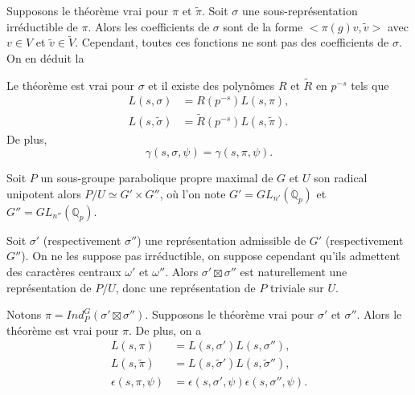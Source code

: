 Supposons le théorème vrai pour $\pi$ et $\tilde{\pi}$. Soit $\sigma$ une sous-représentation irréductible de $\pi$. Alors les coefficients de $\sigma$ sont de la forme $<\pi(g)v,\tilde{v}>$ avec $v\in V$ et $\tilde{v} \in \tilde{V}$. Cependant, toutes ces fonctions ne sont pas des coefficients de $\sigma$. On en déduit la
\begin{proposition}
\label{comp_ind1}
Le théorème est vrai pour $\sigma$ et il existe des polynômes $R$ et $\tilde{R}$ en $p^{-s}$ tels que
\begin{align}
L(s,\sigma)&=R(p^{-s})L(s,\pi), \\
L(s,\tilde{\sigma})&=\tilde{R}(p^{-s})L(s,\tilde{\pi}).
\end{align}
De plus,
\begin{equation}
\gamma(s,\sigma,\psi)=\gamma(s,\pi,\psi).
\end{equation}
\end{proposition}

Soit $P$ un sous-groupe parabolique propre maximal de $G$ et $U$ son radical unipotent alors $P/U \simeq G' \times G''$, où l'on note $G'=GL_{n'}(\mathbb{Q}_p)$ et $G''=GL_{n''}(\mathbb{Q}_p)$.

Soit $\sigma'$ (respectivement $\sigma''$) une représentation admissible de $G'$ (respectivement $G''$). On ne les suppose pas irréductible, on suppose cependant qu'ils admettent des caractères centraux $\omega'$ et $\omega''$. Alors $\sigma' \boxtimes \sigma''$ est naturellement une représentation de $P/U$, donc une représentation de $P$ triviale sur $U$.
\begin{proposition}
\label{comp_ind2}
Notons $\pi = Ind_P^G(\sigma' \boxtimes \sigma'')$. Supposons le théorème vrai pour $\sigma'$ et $\sigma''$. Alors le théorème est vrai pour $\pi$. De plus, on a
\begin{align}
L(s,\pi)&=L(s,\sigma')L(s,\sigma''), \\
L(s,\tilde{\pi})&=L(s,\tilde{\sigma}')L(s,\tilde{\sigma}''), \\
\epsilon(s,\pi,\psi)&=\epsilon(s,\sigma',\psi)\epsilon(s,\sigma'',\psi).
\end{align}
\end{proposition}

